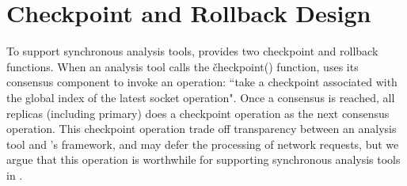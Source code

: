 

% 
% 



\section{Checkpoint and Rollback Design} \label{sec:checkpoint}

To support synchronous analysis tools, \xxx provides two checkpoint and rollback 
functions. When an analysis tool calls the \v{checkpoint()} function, \xxx 
uses its \paxos consensus component to invoke an operation: ``take a checkpoint 
associated with the global index of the latest socket operation". Once a 
consensus is reached, all replicas (including primary) does a checkpoint 
operation as the next consensus operation. This checkpoint operation trade off 
transparency between an analysis tool and \xxx's framework, and may defer 
the processing of network requests, but we argue that this operation is worthwhile 
for supporting synchronous analysis tools in \xxx.

